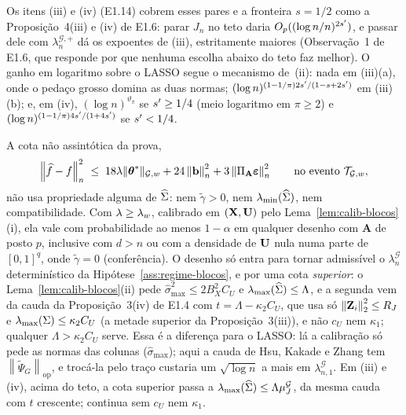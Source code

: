 \documentclass[11pt,a4paper]{article}
\newcommand{\lmin}{\lambda_{\min}}
\newcommand{\lmaxx}{\lambda_{\max}}
\newcommand{\Amat}{\mathbf{A}}
\newcommand{\PA}{\Pi_{\Amat}}
\newcommand{\bveps}{\boldsymbol{\varepsilon}}
\newcommand{\bb}{\mathbf{b}}
\newcommand{\smax}{\widehat{\sigma}_{\max}}
\newcommand{\gtil}{\widetilde{\gamma}}
\newcommand{\opnorm}[1]{\left\lVert #1 \right\rVert_{\mathrm{op}}}
\newcommand{\Gcal}{\mathcal{G}}
\newcommand{\nGw}[1]{\lVert #1\rVert_{\mathcal{G},w}}
\newcommand{\Psitil}{\widetilde{\Psi}}
\newcommand{\lamG}{\lambda^{\mathcal{G}}_{n}}
\newcommand{\lamGone}{\lambda^{\mathcal{G}}_{n,1}}
\newcommand{\lamGp}{\lambda^{\mathcal{G},+}_{n}}   %
\newcommand{\Tw}{\mathcal{T}_{\mathcal{G},w}}
\begin{document}
\begin{remark}
Os itens (iii) e (iv) (E1.14) cobrem esses pares e a fronteira $s = 1/2$ como
a Proposição~4(iii) e (iv) de E1.6: parar $J_{n}$ no teto daria
$O_{p}((\log n/n)^{2s'})$, e passar dele com $\lamGp$ dá os expoentes
de (iii), estritamente maiores (Observação~1 de E1.6, que responde por que
nenhuma escolha abaixo do teto faz melhor). O ganho em logaritmo sobre o
LASSO segue o mecanismo de~(ii): nada em (iii)(a), onde o pedaço grosso
domina as duas normas; $(\log n)^{(1-1/\pi)2s'/(1-s+2s')}$ em (iii)(b);
e, em (iv), $(\log n)^{\vartheta_{\pi}}$ se $s' \ge 1/4$ (meio logaritmo
em $\pi \ge 2$) e $(\log n)^{(1-1/\pi)4s'/(1+4s')}$ se $s' < 1/4$.
\end{remark}

\begin{remark}\label{rem:lenta-desenho}
A cota não assintótica da prova,
\begin{equation}
  \label{eq:lenta-nao-assint}
  \normn{\widehat f - f}^{2} \;\le\; 18\pen\nGw{\thetastar}
  + 24\normn{\bb}^{2} + 3\normn{\PA\bveps}^{2}
  \qquad\text{no evento } \Tw,
\end{equation}
não usa propriedade alguma de $\widehat{\Sigma}$: nem $\gtil > 0$, nem
$\lmin(\Gramhat)$, nem compatibilidade. Com $\lambda \ge \lambda_{w}$, calibrado em
$(\mathbf{X},\mathbf{U})$ pelo Lema~\ref{lem:calib-blocos}(i), ela vale com probabilidade ao
menos $1 - \alpha$ em qualquer desenho com $\Amat$ de posto $p$, inclusive com
$d > n$ ou com a densidade de $\mathbf{U}$ nula numa parte de $[0,1]^{q}$, onde
$\gtil = 0$ (conferência). O desenho só entra para tornar admissível o $\lamG$
determinístico da Hipótese~\ref{ass:regime-blocos}, e por uma cota
\emph{superior}: o Lema~\ref{lem:calib-blocos}(ii) pede $\smax^{2} \le
2B_{X}^{2}C_{U}$ e $\lmaxx(\Gramhat) \le \Lambda$, e a segunda vem da cauda da
Proposição~3(iv) de E1.4 com $t = \Lambda - \kappa_{2}C_{U}$, que usa só
$\left\lVert \mathbf{Z}_{i} \right\rVert_{2}^{2} \le R_{J}$ e $\lmaxx(\Gram) \le \kappa_{2}C_{U}$ (a
metade superior da Proposição~3(iii)), e não $c_{U}$ nem $\kappa_{1}$;
qualquer $\Lambda > \kappa_{2}C_{U}$ serve. Essa é a diferença para o LASSO:
lá a calibração só pede as normas das colunas ($\smax$); aqui a cauda de Hsu,
Kakade e Zhang tem $\opnorm{\Psitil_{G}}$, e trocá-la pelo traço custaria um
$\sqrt{\log n}$ a mais em $\lamGone$. Em (iii) e (iv), acima do teto, a cota
superior passa a $\lmaxx(\Gramhat) \le \Lambda\mu^{\Gcal}_{J}$, da mesma cauda
com $t$ crescente; continua sem $c_{U}$ nem $\kappa_{1}$.
\end{remark}
\end{document}
